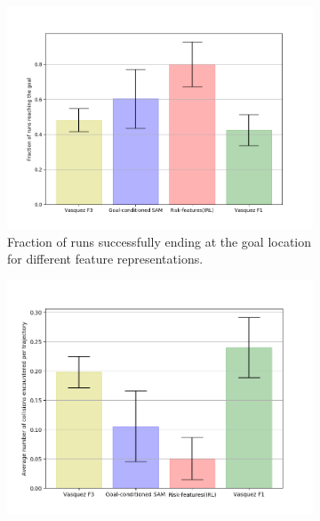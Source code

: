 \begin{figure}[!htbp]
	\begin{subfigure}[t]{.5\columnwidth}
	\centering
	\includegraphics[width=\columnwidth]{plots/plot_without_outliers/zara02_inter_irl_no_outlier/goal_reached_zara02_no_outlier_inter_irl.png}
	\caption{Fraction of runs successfully ending at the goal location for different feature representations.}
	\label{fig:inter_method-goal_reached-zara02}
	\end{subfigure}%
	\begin{subfigure}[t]{.5\columnwidth}
		\centering
		\includegraphics[width=\columnwidth]{plots/plot_without_outliers/zara02_inter_irl_no_outlier/count_collisions_zara02_no_outlier_inter_irl.png}
		\label{fig:inter_method-count_collisions-zara02}
	\end{subfigure}%
	\label{fig:inter_method-classic_navigation_metrics-zara02}
\end{figure}

